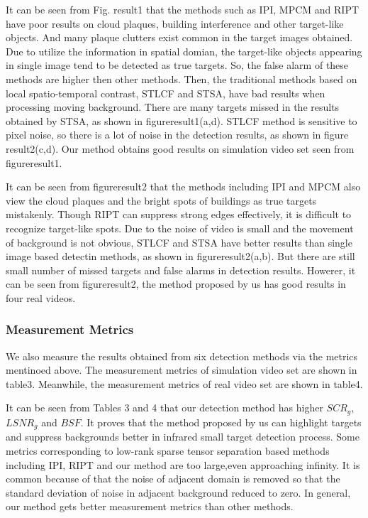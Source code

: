 \documentclass[journal]{IEEEtran}
\begin{document}
It can be seen from Fig. result1 that the methods such as IPI, MPCM and RIPT have poor results on cloud plaques, building interference and other target-like objects. And many plaque clutters exist common in the target images obtained. Due to utilize the information in spatial domian, the target-like objects appearing in single image tend to be detected as true targets. So, the false alarm of these methods are higher then other methods. Then, the traditional methods based on local spatio-temporal contrast, STLCF and STSA, have bad results when processing moving background. There are many targets missed in the results obtained by STSA, as shown in figureresult1(a,d). STLCF method is sensitive to pixel noise, so there is a lot of noise in the detection results, as shown in figure result2(c,d). Our method obtains good results on simulation video set seen from figureresult1.

It can be seen from figureresult2 that the methods including IPI and MPCM also view the cloud plaques and the bright spots of buildings as true targets mistakenly. Though RIPT can suppress strong edges effectively, it is difficult to recognize
 target-like spots. Due to the noise of video is small and the movement of background is not obvious, STLCF and STSA have better results than single image based detectin methods, as shown in figureresult2(a,b). But there are still small number of missed targets and false alarms in detection results. Howerer, it can be seen from figureresult2, the method proposed by us has good results in four real videos.

 

 \subsubsection{Measurement Metrics}
We also measure the results obtained from six detection methods via the metrics mentinoed above. The measurement metrics of simulation video set are shown in table3. Meanwhile, the measurement metrics of real video set are shown in table4.

It can be seen from Tables 3 and 4 that our detection method has higher $SCR_g$, $LSNR_g$ and $BSF$. It proves that the method proposed by us can highlight targets and suppress backgrounds better in infrared small target detection process. Some metrics corresponding to low-rank sparse tensor separation based methods including IPI, RIPT and our method are too large,even approaching infinity. It is common because of that the noise of adjacent domain is removed so that the standard deviation of noise in adjacent background reduced to zero. In general, our method gets better measurement metrics than other methods.
\end{document}
